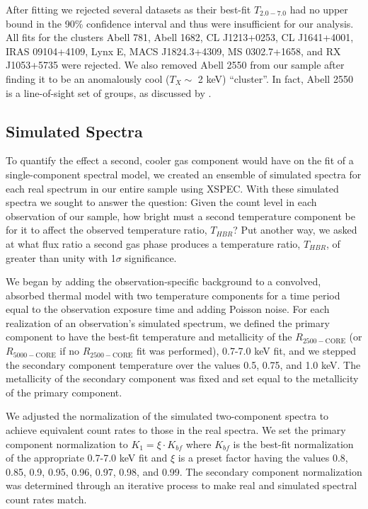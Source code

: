 \documentclass[12pt,preprint]{aastex}
\begin{document}
After fitting we rejected several datasets as their best-fit $T_{2.0-7.0}$
had no upper bound in the 90\% confidence interval and thus were
insufficient for our analysis. All fits for the clusters Abell 781,
Abell 1682, CL J1213+0253, CL J1641+4001, IRAS 09104+4109, Lynx E,
MACS J1824.3+4309, MS 0302.7+1658, and RX J1053+5735 were rejected. We
also removed Abell 2550 from our sample after finding it to be an
anomalously cool ($T_{X} \sim$ 2 keV) ``cluster''. In fact, Abell 2550
is a line-of-sight set of groups, as discussed by
\cite{2004cgpc.sympE..31M}.

\subsection{Simulated Spectra}\label{sec:simulated}

To quantify the effect a second, cooler gas component would have on the fit
of a single-component spectral model, we created an ensemble of simulated
spectra for each real spectrum in our entire sample using
{\textsc{XSPEC}}. With these simulated spectra we sought to answer the
question: Given the count level in each observation of our sample, how bright
must a second temperature component be for it to affect the observed
temperature ratio, $T_{HBR}$? Put another way, we asked at what flux
ratio a second gas phase produces a temperature ratio, $T_{HBR}$, of
greater than unity with 1$\sigma$ significance.

We began by adding the observation-specific background to a convolved,
absorbed thermal model with two temperature components for a time
period equal to the observation exposure time and adding Poisson
noise. For each realization of an observation's simulated spectrum, we
defined the primary component to have the best-fit temperature and
metallicity of the $R_{2500-\mathrm{CORE}}$ (or $R_{5000-\mathrm{CORE}}$
if no $R_{2500-\mathrm{CORE}}$ fit was performed), 0.7-7.0 keV fit, and
we stepped the secondary component temperature over the values 0.5,
0.75, and 1.0 keV. The metallicity of the secondary component was
fixed and set equal to the metallicity of the primary component.

We adjusted the normalization of the simulated two-component spectra to
achieve equivalent count rates to those in the real spectra. We set
the primary component normalization to $K_1 = \xi \cdot K_{bf}$ where
$K_{bf}$ is the best-fit normalization of the appropriate
0.7-7.0 keV fit and $\xi$ is a preset factor having the values 0.8,
0.85, 0.9, 0.95, 0.96, 0.97, 0.98, and 0.99. The secondary component
normalization was determined through an iterative process to make real
and simulated spectral count rates match.
\end{document}

